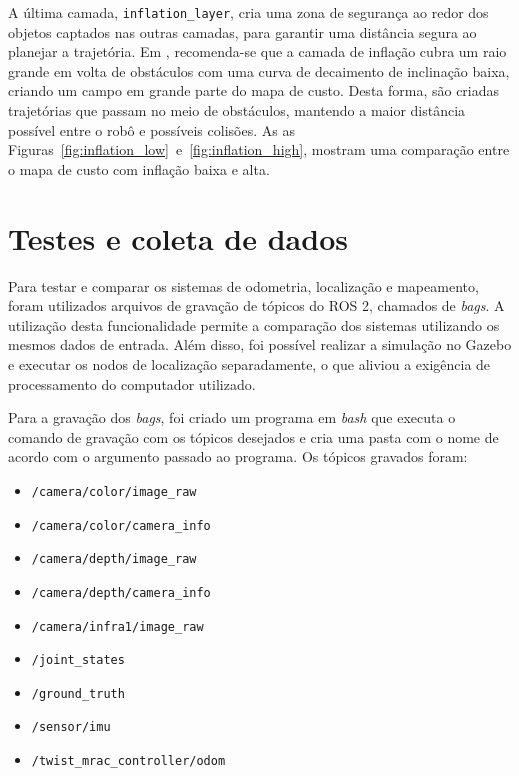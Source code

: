 \documentclass[repeatfields,xlists,xpacks,oneside,yearsonly]{ufrgscca}
\begin{document}

A última camada, \texttt{inflation\_layer}, cria uma zona de
segurança ao redor dos objetos captados nas outras camadas, para
garantir uma distância segura ao planejar a trajetória. Em
\textcite{ros_tuning_guide}, recomenda-se que a camada de inflação
cubra um raio grande em volta de obstáculos com uma curva de
decaimento de inclinação baixa, criando um campo em grande parte do
mapa de custo. Desta forma, são criadas trajetórias que passam no
meio de obstáculos, mantendo a maior distância possível entre o robô
e possíveis colisões. As as
Figuras~\ref{fig:inflation_low}~e~\ref{fig:inflation_high}, mostram
uma comparação entre o mapa de custo com inflação baixa e alta.

\section{Testes e coleta de dados}
\label{met:testes}

Para testar e comparar os sistemas de odometria, localização e
mapeamento, foram utilizados arquivos de gravação de tópicos do ROS
2, chamados de \textit{bags}. A utilização desta funcionalidade
permite a comparação dos sistemas utilizando os mesmos dados de
entrada. Além disso, foi possível realizar a simulação no Gazebo e
executar os nodos de localização separadamente, o que aliviou a
exigência de processamento do computador utilizado.

Para a gravação dos \textit{bags}, foi criado um programa em
\textit{bash} que executa o comando de gravação com os tópicos
desejados e cria uma pasta com o nome de acordo com o argumento
passado ao programa. Os tópicos gravados foram:
\begin{itemize}
    \item \texttt{/camera/color/image\_raw}
    \item \texttt{/camera/color/camera\_info}
    \item \texttt{/camera/depth/image\_raw}
    \item \texttt{/camera/depth/camera\_info}
    \item \texttt{/camera/infra1/image\_raw}
    \item \texttt{/joint\_states}
    \item \texttt{/ground\_truth}
    \item \texttt{/sensor/imu}
    \item \texttt{/twist\_mrac\_controller/odom}
\end{itemize}
\end{document}
